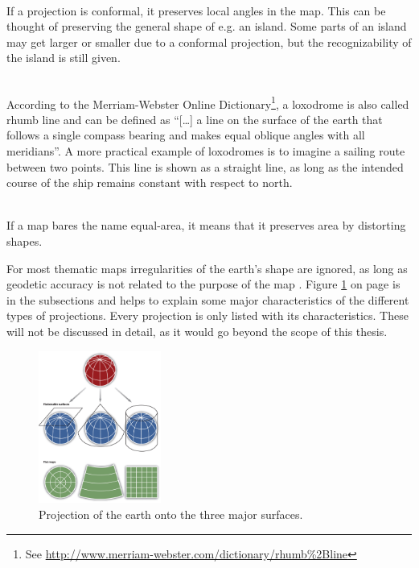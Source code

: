 \begin{enumerate}

 \hfill \\
If a projection is conformal, it preserves local angles in the map. This can be thought of preserving the general shape of e.g. an island. Some parts of an island may get larger or smaller due to a conformal projection, but the recognizability of the island is still given.

 \hfill \\
According to the Merriam-Webster Online Dictionary\footnote{See \href{http://www.merriam-webster.com/dictionary/rhumb\%2Bline}{http://www.merriam-webster.com/dictionary/rhumb\%2Bline}}, a loxodrome is also called rhumb line and can be defined as ``[\ldots] a line on the surface of the earth that follows a single compass bearing and makes equal oblique angles with all meridians''. A more practical example of loxodromes is to imagine a sailing route between two points. This line is shown as a straight line, as long as the intended course of the ship remains constant with respect to north.

 \hfill \\
If a map bares the name equal-area, it means that it preserves area by distorting shapes.

\end{enumerate}

For most thematic maps irregularities of the earth's shape are ignored, as long as geodetic accuracy is not related to the purpose of the map . Figure \ref{fig:projections-base} on page \pageref{fig:projections-base} is in the subsections and helps to explain some major characteristics of the different types of projections. Every projection is only listed with its characteristics. These will not be discussed in detail, as it would go beyond the scope of this thesis.

\begin{figure}[!htb]
\centering
\includegraphics[height=5cm,keepaspectratio]{images/methods/projections/overview.jpg}
\caption[
    Projection of the earth onto the three major surfaces, Urldate: 08.2016 \newline
    \small\texttt{\url{http://images.flatworldknowledge.com/campbell/campbell-fig02_011.jpg}}.
]{Projection of the earth onto the three major surfaces.}
\label{fig:projections-base}
\end{figure}


